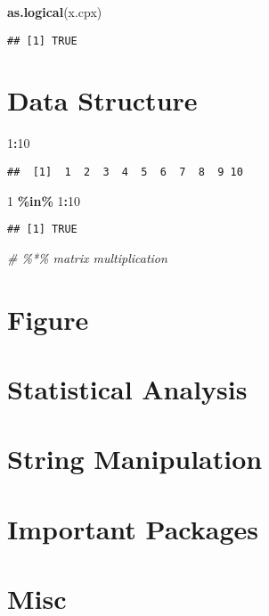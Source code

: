 \documentclass[
  12pt,
]{article}
\newenvironment{Shaded}{\begin{snugshade}}{\end{snugshade}}
\newcommand{\CommentTok}[1]{\textcolor[rgb]{0.56,0.35,0.01}{\textit{#1}}}
\newcommand{\DecValTok}[1]{\textcolor[rgb]{0.00,0.00,0.81}{#1}}
\newcommand{\FunctionTok}[1]{\textcolor[rgb]{0.13,0.29,0.53}{\textbf{#1}}}
\newcommand{\NormalTok}[1]{#1}
\newcommand{\SpecialCharTok}[1]{\textcolor[rgb]{0.81,0.36,0.00}{\textbf{#1}}}
\begin{document}
\begin{Shaded}
\begin{Highlighting}[]
\FunctionTok{as.logical}\NormalTok{(x.cpx)}
\end{Highlighting}
\end{Shaded}

\begin{verbatim}
## [1] TRUE
\end{verbatim}

\newpage
\section{Data Structure}
\label{sec:DS}

\begin{Shaded}
\begin{Highlighting}[]
\DecValTok{1}\SpecialCharTok{:}\DecValTok{10}
\end{Highlighting}
\end{Shaded}

\begin{verbatim}
##  [1]  1  2  3  4  5  6  7  8  9 10
\end{verbatim}

\begin{Shaded}
\begin{Highlighting}[]
\DecValTok{1} \SpecialCharTok{\%in\%} \DecValTok{1}\SpecialCharTok{:}\DecValTok{10}
\end{Highlighting}
\end{Shaded}

\begin{verbatim}
## [1] TRUE
\end{verbatim}

\begin{Shaded}
\begin{Highlighting}[]
\CommentTok{\# \%*\% matrix multiplication}
\end{Highlighting}
\end{Shaded}

\newpage
\section{Figure}
\label{sec:Fig}

\newpage
\section{Statistical Analysis}
\label{sec:SA}

\newpage
\section{String Manipulation}
\label{sec:SM}

\newpage
\section{Important Packages}
\label{sec:Pkg}

\newpage
\section{Misc}
\label{sec:Misc}
\end{document}
